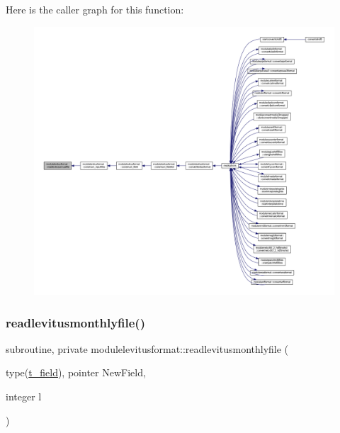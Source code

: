 Here is the caller graph for this function\+:\nopagebreak
\begin{figure}[H]
\begin{center}
\leavevmode
\includegraphics[width=350pt]{namespacemodulelevitusformat_aefc320bae22e2d949151376118a03ce4_icgraph}
\end{center}
\end{figure}
\mbox{\label{namespacemodulelevitusformat_abe175ce441457a68d1d3d191baa3732a}} 
\subsubsection{\texorpdfstring{readlevitusmonthlyfile()}{readlevitusmonthlyfile()}}
{\footnotesize\ttfamily subroutine, private modulelevitusformat\+::readlevitusmonthlyfile (\begin{DoxyParamCaption}\item[{type(\mbox{\hyperlink{structmodulelevitusformat_1_1t__field}{t\+\_\+field}}), pointer}]{New\+Field,  }\item[{integer}]{l }\end{DoxyParamCaption})\hspace{0.3cm}{\ttfamily [private]}}

